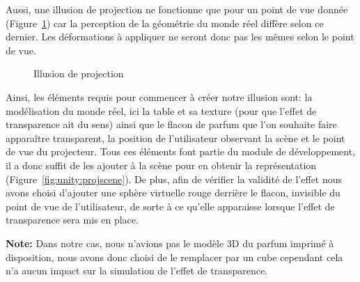 Aussi, une illusion de projection ne fonctionne que pour un point de vue donnée (Figure~\ref{fig:projpov}) car la perception de la géométrie du monde réel diffère selon ce dernier. Les déformations à appliquer ne seront donc pas les mêmes selon le point de vue.

\begin{figure}[H]
\centering
\caption{Illusion de projection}
\label{fig:projpov}
\end{figure}

Ainsi, les éléments requis pour commencer à créer notre illusion sont: la modélisation du monde réel, ici la table et sa texture (pour que l'effet de transparence ait du sens) ainsi que le flacon de parfum que l'on souhaite faire apparaître transparent, la position de l'utilisateur observant la scène et le point de vue du projecteur. Tous ces éléments font partie du module de développement, il a donc suffit de les ajouter à la scène pour en obtenir la représentation (Figure~\ref{fig:unity:projscene}).
De plus, afin de vérifier la validité de l'effet nous avons choisi d'ajouter une sphère virtuelle rouge derrière le flacon, invisible du point de vue de l'utilisateur, de sorte à ce qu'elle apparaisse lorsque l'effet de transparence sera mis en place.

\textbf{Note:} Dans notre cas, nous n'avions pas le modèle 3D du parfum imprimé à disposition, nous avons donc choisi de le remplacer par un cube cependant cela n'a aucun impact sur la simulation de l'effet de transparence.

